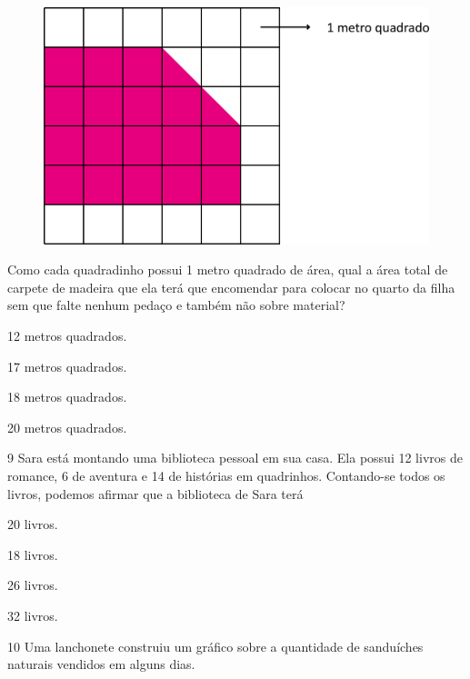 \begin{figure}[htpb!]
\centering
\includegraphics[width=.5\textwidth]{./media/image108.png}
\end{figure}

Como cada quadradinho possui 1 metro quadrado de área, qual a área total de carpete de madeira que ela terá que encomendar para colocar no quarto da filha sem que falte nenhum pedaço e também não sobre material?

\begin{multicols}{2}
\begin{escolha}
\item
  12 metros quadrados.
\item
  17 metros quadrados.
\item
  18 metros quadrados.
\item
  20 metros quadrados.
\end{escolha}
\end{multicols}

\num{9} Sara está montando uma biblioteca pessoal em sua casa. Ela possui 12 livros de romance, 6 de aventura e 14 de histórias em quadrinhos. Contando-se todos os livros, podemos afirmar que a biblioteca de Sara terá

\begin{multicols}{2}
\begin{escolha}
\item
  20 livros.
\item
  18 livros.
\item
  26 livros.
\item
  32 livros.
\end{escolha}
\end{multicols}

\num{10} Uma lanchonete construiu um gráfico sobre a quantidade de sanduíches
naturais vendidos em alguns dias.

